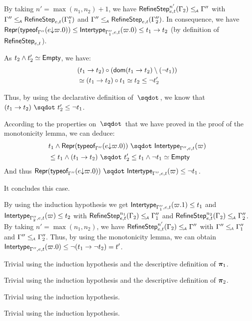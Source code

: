 \documentclass[a4paper]{article}
\theoremstyle{definition}
\begin{document}
\begin{description}
\begin{description}
      By taking $n'=\max (n_1,n_2) + 1$,
      we have $\RefineStep {e,t}^{n'} (\Gamma_2) \leqA \Gamma''$ with $\Gamma'' \leqA \RefineStep {e,t} (\Gamma_1'')$
      and $\Gamma'' \leqA \RefineStep {e,t} (\Gamma_2'')$.
      In consequence, we have $\tsrep{\tyof {\occ e {\varpi.0}} {\Gamma''}} \leq \env {\Gamma_1'',e,t} (\varpi.0) \leq \arrow {t_1} {t_2}$
      (by definition of $\RefineStep {e,t}$).

      As $t_2\land t_2' \simeq \Empty$, we have:
      \begin{align*}
        &\apply {(\arrow {t_1} {t_2})} {(\dom{\arrow {t_1} {t_2}}\setminus(\neg t_1))}\\
        &\simeq \apply {(\arrow {t_1} {t_2})} {t_1} \simeq t_2 \leq \neg t_2'
      \end{align*}

      Thus, by using the declarative definition of $\worra {} {}$, we know that
      $\worra {(\arrow {t_1} {t_2})} {t_2'} \leq \neg t_1$.

      According to the properties on $\worra {} {}$ that we have proved in the proof of the monotonicity lemma,
      we can deduce:
      \begin{align*}
      &t_1 \land \worra {\tsrep{\tyof {\occ e {\varpi.0}} {\Gamma''}}} {\env {\Gamma'',e,t} (\varpi)}\\
      &\leq t_1 \land \worra {(\arrow {t_1} {t_2})} {t_2'} \leq t_1 \land \neg t_1 \simeq \Empty
      \end{align*}
      And thus $\worra {\tsrep{\tyof {\occ e {\varpi.0}} {\Gamma''}}} {\env {\Gamma'',e,t} (\varpi)} \leq \neg t_1$.

      It concludes this case.

      \item[\Rule{PAppL}] By using the induction hypothesis we get
      $\env {\Gamma_1'',e,t} (\varpi.1) \leq t_1$ and $\env {\Gamma_2'',e,t} (\varpi) \leq t_2$
      with $\RefineStep {e,t}^{n_1} (\Gamma_2) \leqA \Gamma_1''$ and
      $\RefineStep {e,t}^{n_2} (\Gamma_2) \leqA \Gamma_2''$. By taking $n'=\max (n_1,n_2)$,
      we have $\RefineStep {e,t}^{n'} (\Gamma_2) \leqA \Gamma''$ with $\Gamma'' \leqA \Gamma_1''$ and $\Gamma'' \leqA \Gamma_2''$.
      Thus, by using the monotonicity lemma, we can obtain $\env {\Gamma'',e,t} (\varpi.0) \leq \neg (\arrow {t_1} {\neg t_2}) = t'$.
  
      \item[\Rule{PPairL}] Trivial using the induction hypothesis and the descriptive definition of $\bpi_1$.
      \item[\Rule{PPairR}] Trivial using the induction hypothesis and the descriptive definition of $\bpi_2$.
      \item[\Rule{PFst}] Trivial using the induction hypothesis.
      \item[\Rule{PSnd}] Trivial using the induction hypothesis.
    \end{description}
  \end{description}
\end{document}
